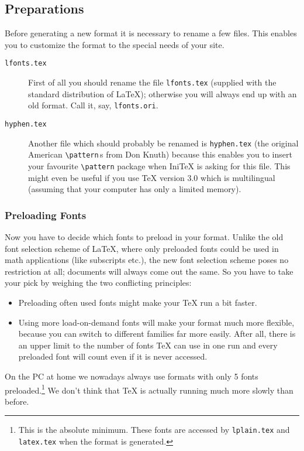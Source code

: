  \subsection{Preparations}
 Before generating a new format it is necessary to rename a few files.
 This enables you to customize the format to the special needs of your
 site.

\begin{description}
  \item [\tt lfonts.tex]
    First of all you should rename the file {\tt lfonts.tex} (supplied
    with the standard distribution of \LaTeX{}); otherwise you
    will always end up with an old format.  Call it, say,
    {\tt lfonts.ori}.
  \item [\tt hyphen.tex]
    Another file which should probably be renamed is {\tt hyphen.tex}
    (the original American \verb+\pattern+$\,$s from Don Knuth) because
    this enables you to insert your favourite \verb+\pattern+ package
    when Ini\TeX{} is asking for this file. This might even be useful
    if you use \TeX{} version 3.0 which is multilingual (assuming that
    your computer has only a limited memory).
\end{description}


\subsubsection{Preloading Fonts}

 Now you have to decide which fonts to preload in your format.  Unlike
 the old font selection scheme of \LaTeX{}, where only preloaded fonts
 could be used in math applications (like subscripts etc.), the new
 font selection scheme poses no restriction at all; documents will
 always come out the same.
 So you have to take your pick by weighing
 the two conflicting principles:
\begin{itemize}
  \item
    Preloading often used fonts might make your \TeX{} run a bit faster.
  \item
    Using more load-on-demand fonts will make your format much more
    flexible, because you can switch to different families far more easily.
    After all, there is an upper limit to the number of fonts \TeX{}
    can use in one run and every preloaded font will count even if it
    is never accessed.
\end{itemize}
 On the PC at home we nowadays always use formats with only 5 fonts
 preloaded.\footnote{This is the absolute minimum. These fonts are
 accessed by {\tt lplain.tex} and {\tt latex.tex} when the format is
 generated.} We don't think that \TeX{} is actually running much
 more slowly than before.

